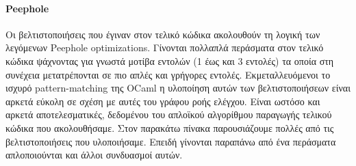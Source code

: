 \documentclass[12pt]{article}
\begin{document}
\paragraph{Peephole} Οι βελτιστοποιήσεις που έγιναν στον τελικό κώδικα ακολουθούν τη λογική των λεγόμενων Peephole optimizations. Γίνονται πολλαπλά περάσματα στον τελικό κώδικα ψάχνοντας για γνωστά μοτίβα εντολών (1 έως και 3 εντολές) τα οποία στη συνέχεια μετατρέπονται σε πιο απλές και γρήγορες εντολές. Εκμεταλλευόμενοι το ισχυρό pattern-matching της OCaml η υλοποίηση αυτών των βελτιστοποιήσεων είναι αρκετά εύκολη σε σχέση με αυτές του γράφου ροής ελέγχου. Είναι ωστόσο και αρκετά αποτελεσματικές, δεδομένου του απλοϊκού αλγορίθμου παραγωγής τελικού κώδικα που ακολουθήσαμε. Στον παρακάτω πίνακα παρουσιάζουμε πολλές από τις βελτιστοποιήσεις που υλοποιήσαμε. Επειδή γίνονται παραπάνω από ένα περάσματα απλοποιούνται και άλλοι συνδυασμοί αυτών.
\end{document}
